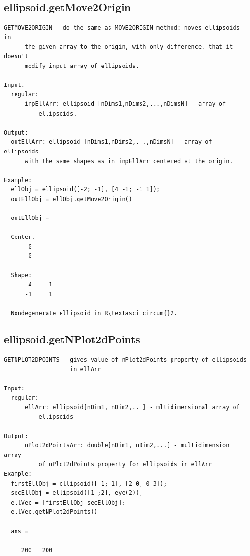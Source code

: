 \documentclass[letterpaper,10pt,english]{sphinxmanual}
\begin{document}
\subsection{ellipsoid.getMove2Origin}
\label{chap_functions:ellipsoid-getmove2origin}
\begin{Verbatim}[commandchars=\\\{\}]
GETMOVE2ORIGIN - do the same as MOVE2ORIGIN method: moves ellipsoids in
      the given array to the origin, with only difference, that it doesn't
      modify input array of ellipsoids.

Input:
  regular:
      inpEllArr: ellipsoid [nDims1,nDims2,...,nDimsN] - array of
          ellipsoids.

Output:
  outEllArr: ellipsoid [nDims1,nDims2,...,nDimsN] - array of ellipsoids
      with the same shapes as in inpEllArr centered at the origin.

Example:
  ellObj = ellipsoid([-2; -1], [4 -1; -1 1]);
  outEllObj = ellObj.getMove2Origin()

  outEllObj =

  Center:
       0
       0

  Shape:
       4    -1
      -1     1

  Nondegenerate ellipsoid in R\textasciicircum{}2.
\end{Verbatim}


\subsection{ellipsoid.getNPlot2dPoints}
\label{chap_functions:ellipsoid-getnplot2dpoints}
\begin{Verbatim}[commandchars=\\\{\}]
GETNPLOT2DPOINTS - gives value of nPlot2dPoints property of ellipsoids
                   in ellArr

Input:
  regular:
      ellArr: ellipsoid[nDim1, nDim2,...] - mltidimensional array of
          ellipsoids

Output:
      nPlot2dPointsArr: double[nDim1, nDim2,...] - multidimension array
          of nPlot2dPoints property for ellipsoids in ellArr
Example:
  firstEllObj = ellipsoid([-1; 1], [2 0; 0 3]);
  secEllObj = ellipsoid([1 ;2], eye(2));
  ellVec = [firstEllObj secEllObj];
  ellVec.getNPlot2dPoints()

  ans =

     200   200
\end{Verbatim}
\end{document}
